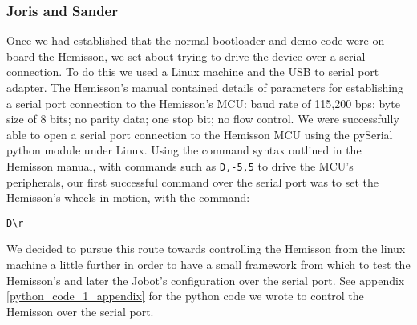 \documentclass[a4paper, 12pt, titlepage]{article}
\begin{document}
\subsubsection{Joris and Sander} %

Once we had established that the normal bootloader and demo code were on board
the Hemisson, we set about trying to drive the device over a serial connection.
To do this we used a Linux machine and the USB to serial port adapter. The
Hemisson's manual contained details of parameters for establishing a serial port 
connection to the Hemisson's MCU: baud rate of 115,200 bps; byte size of 8 bits; 
no parity
data; one stop bit; no flow control. We were successfully able to open a serial
port connection to the Hemisson MCU using the pySerial python module under
Linux. Using the command syntax outlined in the Hemisson manual, with commands
such as \texttt{D,-5,5} to drive the MCU's peripherals, our first successful
command over the serial port was to set the Hemisson's wheels in motion, with
the command: 
\begin{verbatim}D\r\end{verbatim}
We decided to pursue this route towards controlling the Hemisson from the linux
machine a little further in order to have a small framework from which to test
the Hemisson's and later the Jobot's configuration over the serial port.
See appendix \ref{python_code_1_appendix} for the python code we wrote to
control the Hemisson over the serial port.



\end{document}
